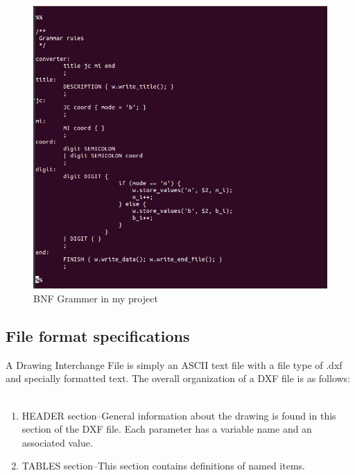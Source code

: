 \begin{figure} [h!]
\centering
\includegraphics[scale=0.3]{images/BNF.png}
\caption{BNF Grammer in my project}
\end{figure}

\subsection{File format specifications}
A Drawing Interchange File is simply an ASCII text file with a file type of .dxf and specially formatted text. The overall organization of a DXF file is as follows:\\\\
\begin{enumerate}
\item HEADER section–General information about the drawing is found in this section of the DXF file. Each parameter has a variable name and an associated value.
\item TABLES section–This section contains definitions of named items.
\end{enumerate}

